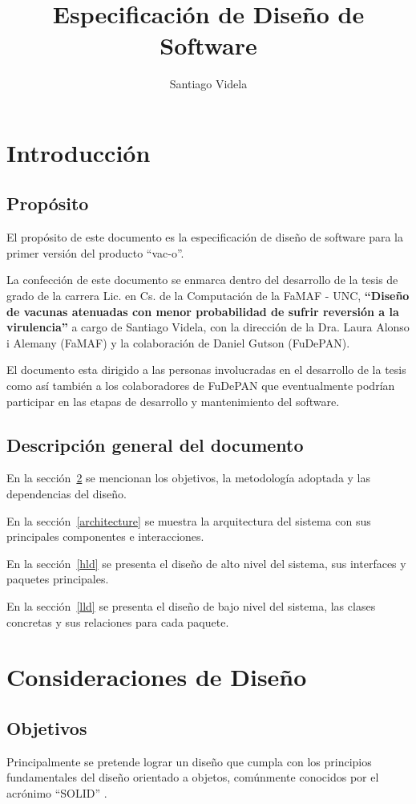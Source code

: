 \documentclass[a4paper,10pt]{article}
\author{Santiago Videla}
\title{Especificaci\'on de Dise\~no de Software}
\begin{document}
\maketitle
\newpage
\tableofcontents
\newpage
\section{Introducci\'on}
  \subsection{Prop\'osito}
  El prop\'osito de este documento es la especificaci\'on de
dise\~no de software para la primer versi\'on del producto ``vac-o''.

  La confecci\'on de este documento se enmarca dentro del desarrollo de la tesis
de grado de la carrera Lic. en Cs. de la Computaci\'on de la FaMAF - UNC,
\textbf{``Dise\~no de vacunas atenuadas con menor probabilidad de sufrir
reversi\'on a la virulencia''} a cargo de Santiago Videla, con la direcci\'on
de la Dra. Laura Alonso i Alemany (FaMAF) y la colaboraci\'on de Daniel
Gutson (FuDePAN).

  El documento esta dirigido a las personas involucradas en el desarrollo de la
tesis como as\'i tambi\'en a los colaboradores de FuDePAN que eventualmente
podr\'ian participar en las etapas de desarrollo y mantenimiento del software.

  \subsection{Descripci\'on general del documento}
  En la secci\'on~\ref{considerations} se mencionan los objetivos, la
metodolog\'ia adoptada y las dependencias del dise\~no.

  En la secci\'on~\ref{architecture} se muestra la arquitectura del
sistema con sus principales componentes e interacciones.

  En la secci\'on~\ref{hld} se presenta el dise\~no de alto nivel del sistema,
sus interfaces y paquetes principales.

  En la secci\'on~\ref{lld} se presenta el dise\~no de bajo nivel del sistema,
las clases concretas y sus relaciones para cada paquete.

\section{Consideraciones de Dise\~no}
  \label{considerations}
  \subsection{Objetivos}
  Principalmente se pretende lograr un dise\~no que cumpla con los principios
fundamentales del dise\~no orientado a objetos, com\'unmente conocidos por el
acr\'onimo ``SOLID'' \cite{martin00}.
  
\end{document}
